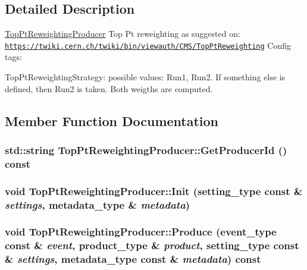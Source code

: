 \subsection{Detailed Description}
\hyperlink{classTopPtReweightingProducer}{TopPtReweightingProducer} Top Pt reweighting as suggested on: \href{https://twiki.cern.ch/twiki/bin/viewauth/CMS/TopPtReweighting}{\tt https://twiki.cern.ch/twiki/bin/viewauth/CMS/TopPtReweighting} Config tags:
\begin{DoxyItemize}
\item TopPtReweightingStrategy: possible values: Run1, Run2. If something else is defined, then Run2 is taken. Both weigths are computed. 
\end{DoxyItemize}

\subsection{Member Function Documentation}
\hypertarget{classTopPtReweightingProducer_a8fb041235c98ea0209154727d2afec87}{
\subsubsection[{GetProducerId}]{\setlength{\rightskip}{0pt plus 5cm}std::string TopPtReweightingProducer::GetProducerId () const}}
\label{classTopPtReweightingProducer_a8fb041235c98ea0209154727d2afec87}
\hypertarget{classTopPtReweightingProducer_a92085c1110d08e3926513ad967316094}{
\subsubsection[{Init}]{\setlength{\rightskip}{0pt plus 5cm}void TopPtReweightingProducer::Init (setting\_\-type const \& {\em settings}, \/  metadata\_\-type \& {\em metadata})}}
\label{classTopPtReweightingProducer_a92085c1110d08e3926513ad967316094}
\hypertarget{classTopPtReweightingProducer_a3681934df5c0df3260d894df2a46b790}{
\subsubsection[{Produce}]{\setlength{\rightskip}{0pt plus 5cm}void TopPtReweightingProducer::Produce (event\_\-type const \& {\em event}, \/  product\_\-type \& {\em product}, \/  setting\_\-type const \& {\em settings}, \/  metadata\_\-type const \& {\em metadata}) const}}
\label{classTopPtReweightingProducer_a3681934df5c0df3260d894df2a46b790}


